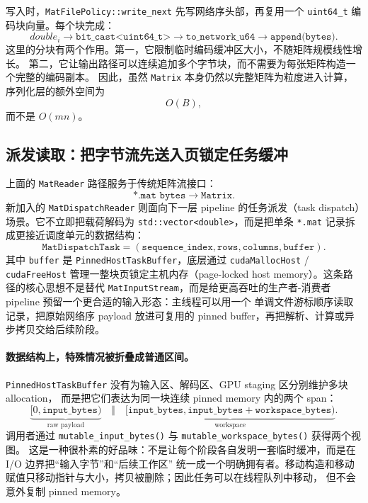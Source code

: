 写入时，\texttt{MatFilePolicy::write\_next} 先写网络序头部，再复用一个
\texttt{uint64\_t} 编码块向量。每个块完成：
\[
    double_i \rightarrow \texttt{bit\_cast<uint64\_t>} \rightarrow \texttt{to\_network\_u64}
    \rightarrow \texttt{append(bytes)}.
\]
这里的分块有两个作用。第一，它限制临时编码缓冲区大小，不随矩阵规模线性增长。
第二，它让输出路径可以连续追加多个字节块，而不需要为每张矩阵构造一个完整的编码副本。
因此，虽然 \texttt{Matrix} 本身仍然以完整矩阵为粒度进入计算，序列化层的额外空间为
\[
    O(B),
\]
而不是 $O(mn)$。

\subsection{派发读取：把字节流先送入页锁定任务缓冲}

上面的 \texttt{MatReader} 路径服务于传统矩阵流接口：
\[
    \texttt{*.mat\ bytes}
    \longrightarrow
    \texttt{Matrix}.
\]
新加入的 \texttt{MatDispatchReader} 则面向下一层 pipeline 的任务派发（task dispatch）场景。它不立即把载荷解码为
\texttt{std::vector<double>}，而是把单条 \texttt{*.mat} 记录拆成更接近调度单元的数据结构：
\[
    \texttt{MatDispatchTask}
    =
    (\texttt{sequence\_index},\texttt{rows},\texttt{columns},\texttt{buffer}).
\]
其中 \texttt{buffer} 是 \texttt{PinnedHostTaskBuffer}，底层通过 \texttt{cudaMallocHost} /
\texttt{cudaFreeHost} 管理一整块页锁定主机内存（page-locked host memory）。这条路径的核心思想不是替代
\texttt{MatInputStream}，而是给更高吞吐的生产者-消费者 pipeline 预留一个更合适的输入形态：主线程可以用一个
单调文件游标顺序读取记录，把原始网络序 payload 放进可复用的 pinned buffer，再把解析、计算或异步拷贝交给后续阶段。

\paragraph{数据结构上，特殊情况被折叠成普通区间。}
\texttt{PinnedHostTaskBuffer} 没有为输入区、解码区、GPU staging 区分别维护多块 allocation，
而是把它们表达为同一块连续 pinned memory 内的两个 span：
\[
    \underbrace{[0,\texttt{input\_bytes})}_{\text{raw payload}}
    \quad\Vert\quad
    \underbrace{[\texttt{input\_bytes},\texttt{input\_bytes}+\texttt{workspace\_bytes})}_{\text{workspace}}.
\]
调用者通过 \texttt{mutable\_input\_bytes()} 与 \texttt{mutable\_workspace\_bytes()} 获得两个视图。
这是一种很朴素的好品味：不是让每个阶段各自发明一套临时缓冲，而是在 I/O 边界把“输入字节”和“后续工作区”
统一成一个明确拥有者。移动构造和移动赋值只移动指针与大小，拷贝被删除；因此任务可以在线程队列中移动，
但不会意外复制 pinned memory。

